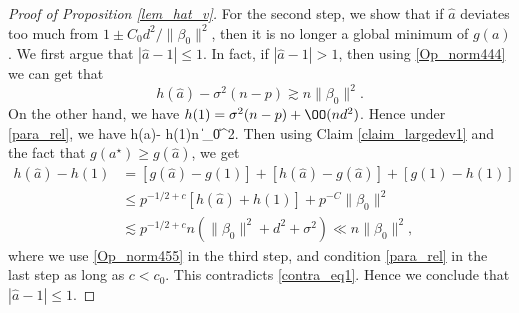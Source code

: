 \documentclass[aos,preprint]{imsart}
\begin{document}
\begin{proof}[Proof of Proposition \ref{lem_hat_v}]
For the second step, we show that if $\hat{a}$ deviates too much from $1\pm C_0 {d^2}/{\|\beta_0\|^2}$, then it is no longer a global minimum of $g(a)$. We first argue that $|\hat a -1|\le 1$.  
In fact, if $|\hat a-1| > 1$, then using \eqref{Op_norm444} we can get that 
$$h(\hat a) -\sigma^2(n-p)\gtrsim n\|\beta_0\|^2 .$$
On the other hand, we have $h(1)= \sigma^2(n-p)+ \OO( n d^2)$. Hence under \eqref{para_rel}, we have
\be\label{contra_eq1}
h(\hat a)- h(1)\gtrsim n \|\beta_0\|^2.
\ee
Then using Claim \ref{claim_largedev1} and the fact that $g(a^\star)\ge g(\hat a)$, we get
\begin{align*}
	h(\hat{a}) - h(1) &= [g(\hat{a}) - g(1)] + [h(\hat{a}) - g(\hat{a})] + [g(1) - h(1)] \\
	&\le p^{-1/2+c}\left[ h(\hat a) +h(1)\right]+ p^{-C}\|\beta_0\|^2 \\
	& \lesssim p^{-1/2+c}n \left(\|\beta_0\|^2 + d^2 + \sigma^2 \right) \ll n \|\beta_0\|^2,
\end{align*}
where we use \eqref{Op_norm455} in the third step, and condition \eqref{para_rel} in the last step as long as $c<c_0$. This contradicts \eqref{contra_eq1}. Hence we conclude that $|\hat a -1|\le 1$. 


\end{proof}
\end{document}
